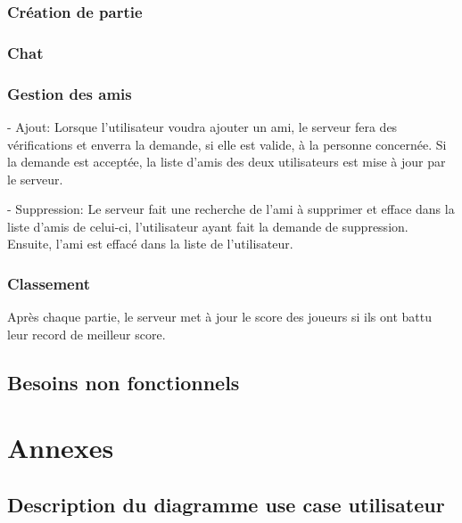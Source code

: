 \documentclass[a4paper,12pt]{article}
\begin{document}
\subsubsection{Création de partie}


\subsubsection{Chat}


\subsubsection{Gestion des amis}

- Ajout: Lorsque l'utilisateur voudra ajouter un ami, le serveur fera des vérifications et enverra la demande, si elle est valide, à la personne concernée. Si la demande est acceptée, la liste d'amis des deux utilisateurs est mise à jour par le serveur.

- Suppression: Le serveur fait une recherche de l'ami à supprimer et efface dans la liste d'amis de celui-ci, l'utilisateur ayant fait la demande de suppression. Ensuite, l'ami est effacé dans la liste de l'utilisateur.


\subsubsection{Classement}

Après chaque partie, le serveur met à jour le score des joueurs si ils ont battu leur record de meilleur score.

\subsection{Besoins non fonctionnels}

\newpage
\section{Annexes}
\subsection{ Description du diagramme use case utilisateur}
\end{document}
